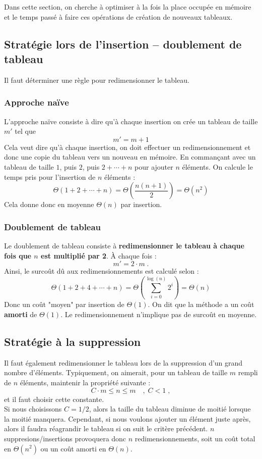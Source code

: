 \documentclass[12pt,a4paper]{book}
\newcommand{\pseudo}[1]{\rouge{\textsc{#1}}}
\begin{document}
Dans cette section, on cherche à optimiser à la fois la place occupée en mémoire et le temps passé à faire ces opérations de création de nouveaux tableaux.

\subsection{Stratégie lors de l'insertion -- doublement de tableau}
Il faut déterminer une règle pour redimensionner le tableau.
\subsubsection{Approche naïve}
 L'approche naïve consiste à dire qu'à chaque insertion on crée un tableau de taille $m'$ tel que 
$$m' = m+1$$
Cela veut dire qu'à chaque insertion, on doit effectuer un redimensionnement et donc une copie du tableau vers un nouveau en mémoire. En commançant avec un tableau de taille $1$, puis $2$, puis $2 + \cdots + n$ pour ajouter $n$ éléments. On calcule le temps pris pour l'insertion de $n$ éléments :
$$\Theta(1+2+\cdots+n) = \Theta\left(\dfrac{n(n+1)}{2}\right) = \Theta(n^2)$$
Cela donne donc en moyenne $\Theta(n)$ par insertion. 

\subsubsection{Doublement de tableau}
Le doublement de tableau consiste à \textbf{redimensionner le tableau à chaque fois que $n$ est multiplié par 2}. À chaque fois :
$$m' = 2 \cdot m \; .$$
Ainsi, le surcoût dû aux redimensionnements est calculé selon :
$$\Theta(1 + 2 + 4 + \cdots + n) = \Theta\left( \sum_{i=0} ^{\log(n)} 2^i \right) = \Theta(n)$$
Donc un coût "moyen" par insertion de $\Theta(1)$. On dit que la méthode \pseudo{Insert} a un coût \textbf{amorti} de $\Theta(1)$. Le redimensionnement n'implique pas de surcoût en moyenne.

\subsection{Stratégie à la suppression}
Il faut également redimensionner le tableau lors de la suppression d'un grand nombre d'éléments. Typiquement, on aimerait, pour un tableau de taille $m$ rempli de $n$ éléments, maintenir la propriété suivante :
$$C \cdot m \leq n \leq m \quad , \; C < 1  \; ,$$
et il faut choisir cette constante. \\
Si nous choisissons $C = 1/2$, alors la taille du tableau diminue de moitié lorsque la moitié manquera. Cependant, si nous voulons ajouter un élément juste après, alors il faudra réagrandir le tableau si on suit le critère précédent. $n$ suppresions/insertions provoquera donc $n$ redimensionnements, soit un coût total en $\Theta(n^2)$ ou un coût amorti en $\Theta(n)$. \\
\end{document}
